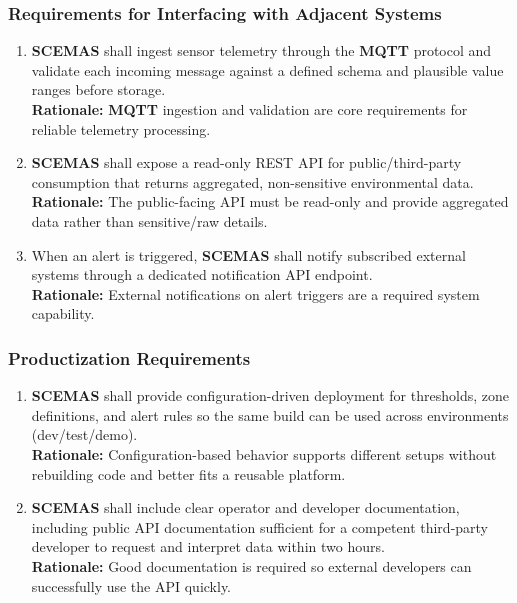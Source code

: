 \documentclass[]{article}
\begin{document}
\subsubsection{Requirements for Interfacing with Adjacent Systems}
\label{ssub:requirements_for_interfacing_with_adjacent_systems}
\begin{enumerate}[{OE-IA}1. ]
	\item \textbf{SCEMAS} shall ingest sensor telemetry through the \textbf{MQTT} protocol and validate each incoming message against a defined schema and plausible value ranges before storage.\\
    \textbf{Rationale:} \textbf{MQTT} ingestion and validation are core requirements for reliable telemetry processing.
    
	\item \textbf{SCEMAS} shall expose a read-only REST API for public/third-party consumption that returns aggregated, non-sensitive environmental data.\\
    \textbf{Rationale:} The public-facing API must be read-only and provide aggregated data rather than sensitive/raw details.
    
	\item When an alert is triggered, \textbf{SCEMAS} shall notify subscribed external systems through a dedicated notification API endpoint.\\
    \textbf{Rationale:} External notifications on alert triggers are a required system capability.
\end{enumerate}

\subsubsection{Productization Requirements}
\label{ssub:productization_requirements}
\begin{enumerate}[{OE-P}1. ]
	\item \textbf{SCEMAS} shall provide configuration-driven deployment for thresholds, zone definitions, and alert rules so the same build can be used across environments (dev/test/demo).\\
    \textbf{Rationale:} Configuration-based behavior supports different setups without rebuilding code and better fits a reusable platform.
    
	\item \textbf{SCEMAS} shall include clear operator and developer documentation, including public API documentation sufficient for a competent third-party developer to request and interpret data within two hours.\\
    \textbf{Rationale:} Good documentation is required so external developers can successfully use the API quickly.
\end{enumerate}
\end{document}
